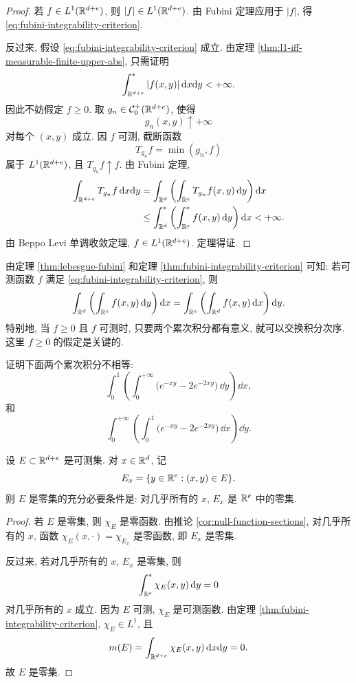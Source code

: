\begin{proof}
	若 \(f\in L^1(\mathbb{R}^{d+e})\), 则 \(|f|\in L^1(\mathbb{R}^{d+e})\). 由 Fubini 定理应用于 \(|f|\), 得 \eqref{eq:fubini-integrability-criterion}.
	
	反过来, 假设 \eqref{eq:fubini-integrability-criterion} 成立. 由定理 \ref{thm:l1-iff-measurable-finite-upper-abs}, 只需证明
	\[
	\int_{\mathbb{R}^{d+e}}^{*}|f(x,y)|\,\dd x\dd y<+\infty.
	\]
	因此不妨假定 \(f\geq0\). 取 \(g_n\in\mathcal{C}_0^+(\mathbb{R}^{d+e})\), 使得
	\[
	g_n(x,y)\uparrow +\infty
	\]
	对每个 \((x,y)\) 成立. 因 \(f\) 可测, 截断函数
	\[
	T_{g_n}f=\min(g_n,f)
	\]
	属于 \(L^1(\mathbb{R}^{d+e})\), 且 \(T_{g_n}f\uparrow f\). 由 Fubini 定理,
	\begin{align*}
		\int_{\mathbb{R}^{d+e}}T_{g_n}f\,\dd x\dd y
		&=\int_{\mathbb{R}^d}\left(\int_{\mathbb{R}^e}T_{g_n}f(x,y)\,\dd y\right)\dd x\\
		&\leq
		\int_{\mathbb{R}^d}^{*}\left(
		\int_{\mathbb{R}^e}^{*}f(x,y)\,\dd y
		\right)\dd x<+\infty.
	\end{align*}
	由 Beppo Levi 单调收敛定理, \(f\in L^1(\mathbb{R}^{d+e})\). 定理得证.
\end{proof}

由定理 \ref{thm:lebesgue-fubini} 和定理 \ref{thm:fubini-integrability-criterion} 可知: 若可测函数 \(f\) 满足 \eqref{eq:fubini-integrability-criterion}, 则
\begin{equation}
	\int_{\mathbb{R}^d}\left(\int_{\mathbb{R}^e}f(x,y)\,\dd y\right)\dd x
	=
	\int_{\mathbb{R}^e}\left(\int_{\mathbb{R}^d}f(x,y)\,\dd x\right)\dd y.
	\label{eq:fubini-change-order}
\end{equation}
特别地, 当 \(f\geq0\) 且 \(f\) 可测时, 只要两个累次积分都有意义, 就可以交换积分次序. 这里 \(f\geq0\) 的假定是关键的.

\begin{exer}\label{exer:two-iterated-integrals-unequal}
	证明下面两个累次积分不相等:
	\[
	\int_0^1\left(\int_0^{+\infty}\bigl(e^{-xy}-2e^{-2xy}\bigr)\,\dd y\right)\dd x,
	\]
	和
	\[
	\int_0^{+\infty}\left(\int_0^1\bigl(e^{-xy}-2e^{-2xy}\bigr)\,\dd x\right)\dd y.
	\]
\end{exer}

\begin{cor}\label{cor:measurable-set-null-sections}
	设 \(E\subset\mathbb{R}^{d+e}\) 是可测集. 对 \(x\in\mathbb{R}^d\), 记
	\[
	E_x=\{y\in\mathbb{R}^e:(x,y)\in E\}.
	\]
	则 \(E\) 是零集的充分必要条件是: 对几乎所有的 \(x\), \(E_x\) 是 \(\mathbb{R}^e\) 中的零集.
\end{cor}

\begin{proof}
	若 \(E\) 是零集, 则 \(\chi_E\) 是零函数. 由推论 \ref{cor:null-function-sections}, 对几乎所有的 \(x\), 函数 \(\chi_E(x,\cdot)=\chi_{E_x}\) 是零函数, 即 \(E_x\) 是零集.
	
	反过来, 若对几乎所有的 \(x\), \(E_x\) 是零集, 则
	\[
	\int_{\mathbb{R}^e}^{*}\chi_E(x,y)\,\dd y=0
	\]
	对几乎所有的 \(x\) 成立. 因为 \(E\) 可测, \(\chi_E\) 是可测函数. 由定理 \ref{thm:fubini-integrability-criterion}, \(\chi_E\in L^1\), 且
	\[
	m(E)=\int_{\mathbb{R}^{d+e}}\chi_E(x,y)\,\dd x\dd y=0.
	\]
	故 \(E\) 是零集.
\end{proof}

